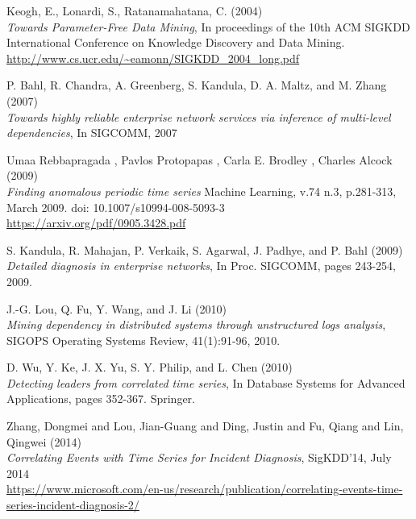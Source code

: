 \documentclass[12pt,a4paper]{article}
\begin{document}
\begin{thebibliography}{9}
Keogh, E., Lonardi, S., Ratanamahatana, C. (2004)\\
\textit{Towards Parameter-Free Data Mining},
In proceedings of the 10th ACM SIGKDD International Conference on Knowledge Discovery and Data Mining.\\
\url{http://www.cs.ucr.edu/~eamonn/SIGKDD_2004_long.pdf}

P. Bahl, R. Chandra, A. Greenberg, S. Kandula, D. A. Maltz, and M. Zhang (2007)\\
\textit{Towards highly reliable enterprise network services via inference of multi-level dependencies}, In SIGCOMM, 2007

Umaa Rebbapragada , Pavlos Protopapas , Carla E. Brodley , Charles Alcock (2009)\\
\textit{Finding anomalous periodic time series}
Machine Learning, v.74 n.3, p.281-313, March 2009. doi: 10.1007/s10994-008-5093-3\\
\url{https://arxiv.org/pdf/0905.3428.pdf}

S. Kandula, R. Mahajan, P. Verkaik, S. Agarwal, J. Padhye, and P. Bahl (2009)\\
\textit{Detailed diagnosis in enterprise networks}, In Proc. SIGCOMM, pages 243-254, 2009.

 J.-G. Lou, Q. Fu, Y. Wang, and J. Li (2010)\\
\textit{Mining dependency in distributed systems through unstructured logs analysis}, SIGOPS Operating Systems Review, 41(1):91-96, 2010.

D. Wu, Y. Ke, J. X. Yu, S. Y. Philip, and L. Chen (2010)\\
\textit{Detecting leaders from correlated time series}, In Database Systems for Advanced Applications, pages 352-367. Springer.

Zhang, Dongmei and Lou, Jian-Guang and Ding, Justin and Fu, Qiang and Lin, Qingwei (2014)\\
\textit{Correlating Events with Time Series for Incident Diagnosis},
SigKDD'14, July 2014\\
\url{https://www.microsoft.com/en-us/research/publication/correlating-events-time-series-incident-diagnosis-2/}



\end{thebibliography}



\end{document}
